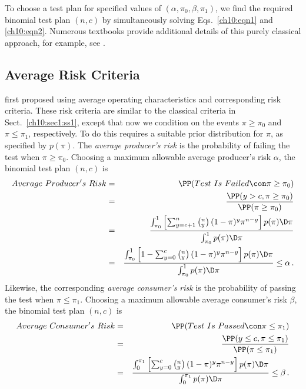 \documentclass {book}
\begin{document}
To choose a test plan for specified values of $(\alpha, \pi_0,
\beta, \pi_1)$, we find the required binomial test plan $(n,c)$ by
simultaneously solving Eqs.~\ref{ch10:eqn1} and \ref{ch10:eqn2}.
Numerous textbooks provide additional details of this purely
classical approach, for example, see \citet{TT95}.

\subsection{Average Risk
Criteria}\label{ch10:sec1:ss2}
\citet{E70} first proposed using average operating characteristics
and corresponding risk criteria. These risk criteria are similar
to the classical criteria in Sect.~\ref{ch10:sec1:ss1}, except
that now we condition on the events $\pi\geq\pi_0$ and
$\pi\leq\pi_1$, respectively. To do this requires a suitable prior
distribution for $\pi$,  as specified by $p(\pi)$. The
\emph{average producer's risk}
is the probability of failing the test when $\pi\geq\pi_0$.
Choosing a maximum allowable average producer's risk $\alpha$, the
binomial test plan $(n,c)$ is 
\begin{eqnarray}\label{ch10:eqn3}
Average\mbox{ }Producer's\mbox{ }Risk & = &
\PP(Test\mbox{ }Is\mbox{ }Failed \con\pi \geq \pi_0)\\
& = & \frac {\PP(y>c,\pi \geq \pi_{0})}{\PP(\pi \geq \pi_{0})}\nonumber\\
& = & \frac{\int^{1}_{\pi_{0}} \left[ \sum^{n}_{y=c+1}
 \left(_y^n\right)(1-\pi)^{y}\pi^{n-y}\right]
p(\pi) \D \pi}{\int^{1}_{\pi_{0}}p(\pi) \D \pi}\nonumber\\
& = & \frac{\int^{1}_{\pi_{0}} \left[1 -\sum^{c}_{y=0}
\left(_y^n\right)(1-\pi)^{y}\pi^{n-y}\right]p(\pi) \D \pi}{
\int^{1}_{\pi_{0}}p(\pi)\D \pi} \leq \alpha \, .\nonumber
\end{eqnarray}
Likewise, the corresponding \emph{average consumer's
risk} is the probability of
passing the test when $\pi\leq\pi_1$. Choosing a maximum allowable
average consumer's risk $\beta$, the binomial test plan $(n,c)$ is
\begin{eqnarray}\label{ch10:eqn4}
Average\mbox{ }Consumer's\mbox{ }Risk & = &
\PP(Test\mbox{ }Is\mbox{ }Passed \con \pi \leq \pi_{1})\\
& = & \frac{\PP(y \leq c,\pi \leq \pi_{1})}{\PP(\pi \leq
\pi_1)}\nonumber\\
& = & \frac{\int^{\pi_1}_{0} \left[\sum^{c}_{y=0}
\left(_y^n\right)(1-\pi)^{y}\pi^{n-y}\right] p(\pi) \D
\pi}{\int^{\pi_1}_{0}p(\pi) \D \pi} \leq \beta \, .\nonumber
\end{eqnarray}
\end{document}
